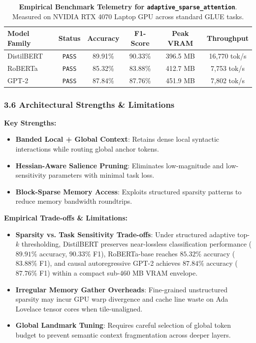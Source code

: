 \begin{table}[h]
\centering
\small
\caption{\textbf{Empirical Benchmark Telemetry for \texttt{adaptive\_sparse\_attention}}. Measured on NVIDIA RTX 4070 Laptop GPU across standard GLUE tasks.}
\label{tab:telemetry_adaptive_sparse_attention}
\begin{tabular*}{\columnwidth}{@{\extracolsep{\fill}}lccccc}
\toprule
\textbf{Model Family} & \textbf{Status} & \textbf{Accuracy} & \textbf{F1-Score} & \textbf{Peak VRAM} & \textbf{Throughput} \\
\midrule
DistilBERT & \texttt{PASS} & 89.91\% & 90.33\% & 396.5 MB & 16,770 tok/s \\
RoBERTa    & \texttt{PASS} & 85.32\% & 83.88\% & 412.7 MB & 7,753 tok/s \\
GPT-2      & \texttt{PASS} & 87.84\% & 87.76\% & 451.9 MB & 7,802 tok/s \\
\bottomrule
\end{tabular*}
\end{table}

\subsubsection*{3.6 Architectural Strengths \& Limitations}
\textbf{Key Strengths:}
\begin{itemize}
    \item \textbf{Banded Local + Global Context}: Retains dense local syntactic interactions while routing global anchor tokens.
    \item \textbf{Hessian-Aware Salience Pruning}: Eliminates low-magnitude and low-sensitivity parameters with minimal task loss.
    \item \textbf{Block-Sparse Memory Access}: Exploits structured sparsity patterns to reduce memory bandwidth roundtrips.
\end{itemize}

\textbf{Empirical Trade-offs \& Limitations:}
\begin{itemize}
    \item \textbf{Sparsity vs. Task Sensitivity Trade-offs}: Under structured adaptive top-$k$ thresholding, DistilBERT preserves near-lossless classification performance ($89.91\%$ accuracy, $90.33\%$ F1), RoBERTa-base reaches $85.32\%$ accuracy ($83.88\%$ F1), and causal autoregressive GPT-2 achieves $87.84\%$ accuracy ($87.76\%$ F1) within a compact sub-460 MB VRAM envelope.
    \item \textbf{Irregular Memory Gather Overheads}: Fine-grained unstructured sparsity may incur GPU warp divergence and cache line waste on Ada Lovelace tensor cores when tile-unaligned.
    \item \textbf{Global Landmark Tuning}: Requires careful selection of global token budget to prevent semantic context fragmentation across deeper layers.
\end{itemize}

